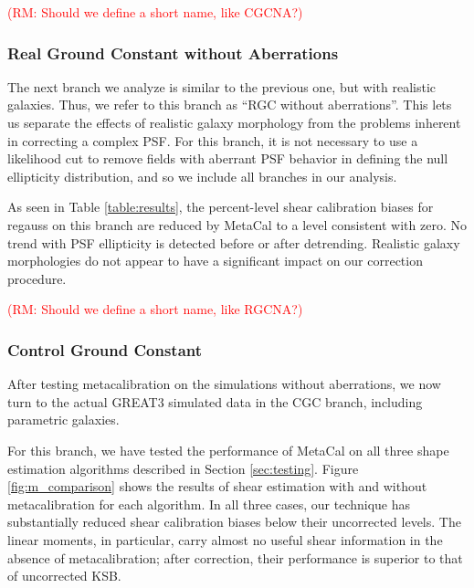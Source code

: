\documentclass[iop]{emulateapj}
\newcommand\rmcomment[1]{\textcolor{red}{(RM: #1)}}
\begin{document}
\rmcomment{Should we define a short name, like CGCNA?}

\subsubsection{Real Ground Constant without Aberrations}

The next branch we analyze is similar to the previous one, but with
realistic galaxies.  Thus, we refer to this branch as ``RGC without
aberrations''. This lets us separate the effects of realistic galaxy
morphology from the problems inherent in correcting a complex PSF. For
this branch, it is not necessary to use a likelihood cut to remove
fields with aberrant PSF behavior in defining the null ellipticity
distribution, and so we include all branches in our analysis.

As seen in Table \ref{table:results}, the percent-level shear
calibration biases for regauss on this branch are reduced by MetaCal
to a level consistent with zero. No trend with PSF ellipticity is
detected before or after detrending. Realistic galaxy morphologies do
not appear to have a significant impact on our correction procedure.

\rmcomment{Should we define a short name, like RGCNA?}

\subsubsection{Control Ground Constant}

After testing metacalibration on the simulations without aberrations,
we now turn to the actual GREAT3 simulated data in the CGC branch,
including parametric galaxies.

For this branch, we have tested the performance of MetaCal on all
three shape estimation algorithms described in Section
\ref{sec:testing}. Figure \ref{fig:m_comparison} shows the results of
shear estimation with and without metacalibration for each
algorithm. In all three cases, our technique has substantially reduced
shear calibration biases below their uncorrected levels. The linear
moments, in particular, carry almost no useful shear information in the
absence of metacalibration; after correction, their performance is
superior to that of uncorrected KSB.
\end{document}
